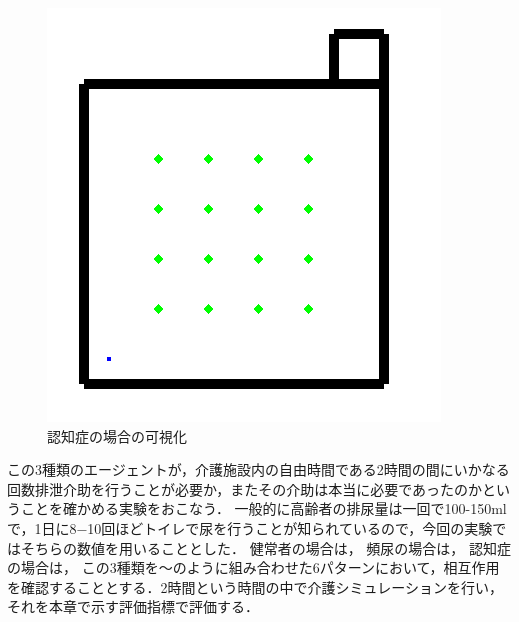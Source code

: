 \begin{figure}[htb]
\begin{center}
 \includegraphics[scale=0.6]{figures/elderly_v3.png}
 \caption[認知症の場合の可視化]{認知症の場合の可視化 \label{elderly_v3}}
\end{center}
\end{figure}

この3種類のエージェントが，介護施設内の自由時間である2時間の間にいかなる回数排泄介助を行うことが必要か，またその介助は本当に必要であったのかということを確かめる実験をおこなう．
一般的に高齢者の排尿量は一回で100-150mlで，1日に8−10回ほどトイレで尿を行うことが知られているので，今回の実験ではそちらの数値を用いることとした．
健常者の場合は，
頻尿の場合は，
認知症の場合は，
この3種類を〜のように組み合わせた6パターンにおいて，相互作用を確認することとする．2時間という時間の中で介護シミュレーションを行い，それを本章で示す評価指標で評価する．

